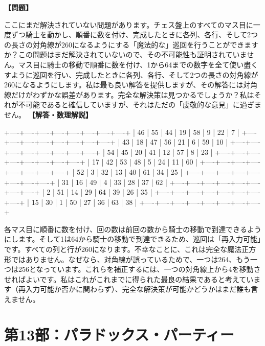 \documentclass[10pt,a4paper,oneside,openany]{ltjsbook}
\begin{document}
\begin{tcolorbox}[colback=softblue,colframe=primaryblue,title=\textbf{第 412 問：魔法の騎士の旅 （原題: THE MAGIC KNIGHT'S TOUR.）},arc=2mm,boxrule=1pt,breakable]
\textbf{【問題】}\par\vspace{0.3em}
ここにまだ解決されていない問題があります。チェス盤上のすべてのマス目に一度ずつ騎士を動かし、順番に数を付け、完成したときに各列、各行、そして2つの長さの対角線が260になるようにする「魔法的な」巡回を行うことができますか？この問題はまだ解決されていないので、その不可能性も証明されていません。マス目に騎士の移動で順番に数を付け、1から64までの数字を全て使い盡くすように巡回を行い、完成したときに各列、各行、そして2つの長さの対角線が260になるようにします。私は最も良い解答を提供しますが、その解答には対角線だけがわずかな誤差があります。完全な解決策は見つかるでしょうか？私はそれが不可能であると確信していますが、それはただの「虔敬的な意見」に過ぎません。
\tcblower
\textbf{【解答・数理解説】}\par\vspace{0.3em}
+----+----+----+----+----+----+----+----+
    | 46 | 55 | 44 | 19 | 58 |  9 | 22 |  7 |
    +----+----+----+----+----+----+----+----+
    | 43 | 18 | 47 | 56 | 21 |  6 | 59 | 10 |
    +----+----+----+----+----+----+----+----+
    | 54 | 45 | 20 | 41 | 12 | 57 |  8 | 23 |
    +----+----+----+----+----+----+----+----+
    | 17 | 42 | 53 | 48 |  5 | 24 | 11 | 60 |
    +----+----+----+----+----+----+----+----+
    | 52 |  3 | 32 | 13 | 40 | 61 | 34 | 25 |
    +----+----+----+----+----+----+----+----+
    | 31 | 16 | 49 |  4 | 33 | 28 | 37 | 62 |
    +----+----+----+----+----+----+----+----+
    |  2 | 51 | 14 | 29 | 64 | 39 | 26 | 35 |
    +----+----+----+----+----+----+----+----+
    | 15 | 30 |  1 | 50 | 27 | 36 | 63 | 38 |
    +----+----+----+----+----+----+----+----+

各マス目に順番に数を付け、回の数は前回の数から騎士の移動で到達できるようにします。そして1は64から騎士の移動で到達できるため、巡回は「再入力可能」です。すべての列と行が260になります。不幸なことに、これは完全な魔法正方形ではありません。なぜなら、対角線が誤っているためで、一つは264、もう一つは256となっています。これらを補正するには、一つの対角線上から4を移動させればよいです。私はこれがこれまでに得られた最良の結果であると考えています（再入力可能か否かに関わらず）、完全な解決策が可能かどうかはまだ誰も言えません。
\end{tcolorbox}

\part{第13部：パラドックス・パーティー}
\end{document}
